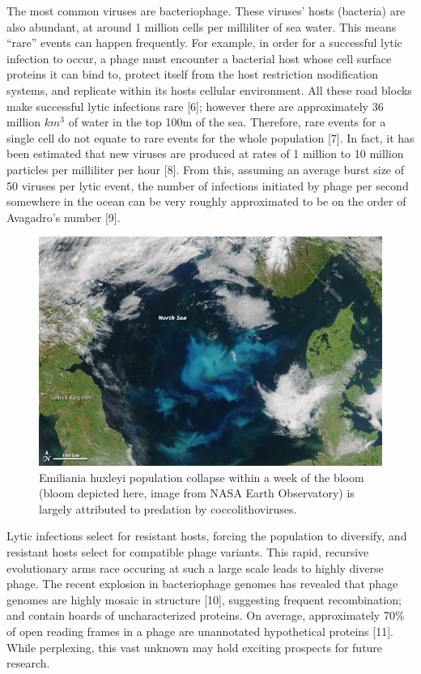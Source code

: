 \documentclass[12pt,twoside]{mitthesis-manusdown}
\begin{document}
The most common viruses are bacteriophage. These viruses' hosts
(bacteria) are also abundant, at around 1 million cells per milliliter
of sea water. This means ``rare'' events can happen frequently. For
example, in order for a successful lytic infection to occur, a phage
must encounter a bacterial host whose cell surface proteins it can bind
to, protect itself from the host restriction modification systems, and
replicate within its hosts cellular environment. All these road blocks
make successful lytic infections rare {[}6{]}; however there are
approximately 36 million \(km^3\) of water in the top 100m of the sea.
Therefore, rare events for a single cell do not equate to rare events
for the whole population {[}7{]}. In fact, it has been estimated that
new viruses are produced at rates of 1 million to 10 million particles
per milliliter per hour {[}8{]}. From this, assuming an average burst
size of 50 viruses per lytic event, the number of infections initiated
by phage per second somewhere in the ocean can be very roughly
approximated to be on the order of Avagadro's number {[}9{]}. \newline
\begin{figure}[tb!]

{\centering \includegraphics[width=0.5\linewidth]{figuresintro/coccolithophores} 

}

\caption{\label{fig:coccolithophores}Emiliania huxleyi population collapse within a week of the bloom (bloom depicted here, image from NASA Earth Observatory) is largely attributed to predation by coccolithoviruses.}\label{fig:coccolithophores}
\end{figure}
Lytic infections select for resistant hosts, forcing the population to
diversify, and resistant hosts select for compatible phage variants.
This rapid, recursive evolutionary arms race occuring at such a large
scale leads to highly diverse phage. The recent explosion in
bacteriophage genomes has revealed that phage genomes are highly mosaic
in structure {[}10{]}, suggesting frequent recombination; and contain
hoards of uncharacterized proteins. On average, approximately 70\% of
open reading frames in a phage are unannotated hypothetical proteins
{[}11{]}. While perplexing, this vast unknown may hold exciting
prospects for future research.
\end{document}
